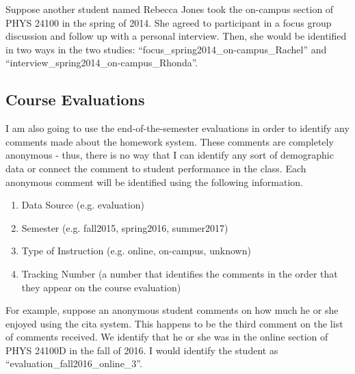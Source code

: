 Suppose another student named Rebecca Jones took the on-campus section of PHYS 24100 in the spring of 2014. She agreed to participant in a focus group discussion and follow up with a personal interview. Then, she would be identified in two ways in the two studies: ``focus\_spring2014\_on-campus\_Rachel'' and ``interview\_spring2014\_on-campus\_Rhonda''.

\subsection{Course Evaluations}

I am also going to use the end-of-the-semester evaluations in order to identify any comments made about the homework system. These comments are completely anonymous - thus, there is no way that I can identify any sort of demographic data or connect the comment to student performance in the class. Each anonymous comment will be identified using the following information.

\begin{enumerate}
\item Data Source (e.g. evaluation)
\item Semester (e.g. fall2015, spring2016, summer2017)
\item Type of Instruction (e.g. online, on-campus, unknown)
\item Tracking Number (a number that identifies the comments in the order that they appear on the course evaluation)
\end{enumerate}

For example, suppose an anonymous student comments on how much he or she enjoyed using the \gls{cita} system. This happens to be the third comment on the list of comments received. We identify that he or she was in the online section of PHYS 24100D in the fall of 2016. I would identify the student as ``evaluation\_fall2016\_online\_3''.